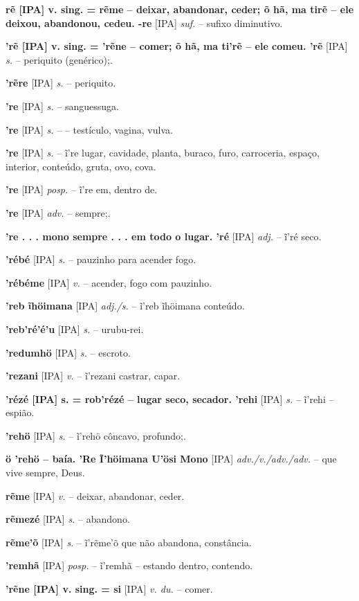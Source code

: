 \textbf{rẽ [IPA] v. sing. = rẽme -- deixar, abandonar, ceder; õ hã, ma tirẽ -- ele deixou, abandonou, cedeu. -re} [IPA] \textit{suf.} -- sufixo diminutivo.

\textbf{'rẽ [IPA] v. sing. = 'rẽne -- comer; õ hã, ma ti'rẽ -- ele comeu. 'rẽ} [IPA] \textit{s.} -- periquito (genérico);.

\textbf{'rẽre} [IPA] \textit{s.} -- periquito.

\textbf{'re} [IPA] \textit{s.} -- sanguessuga.

\textbf{'re} [IPA] \textit{s.} -- -- testículo, vagina, vulva.

\textbf{'re} [IPA] \textit{s.} -- ĩ're lugar, cavidade, planta, buraco, furo, carroceria, espaço, interior, conteúdo, gruta, ovo, cova.

\textbf{'re} [IPA] \textit{posp.} -- ĩ're em, dentro de.

\textbf{'re} [IPA] \textit{adv.} -- sempre;.

\textbf{'re . . . mono sempre . . . em todo o lugar. 'ré} [IPA] \textit{adj.} -- ĩ'ré seco.

\textbf{'rébé} [IPA] \textit{s.} -- pauzinho para acender fogo.

\textbf{'rébéme} [IPA] \textit{v.} -- acender, fogo com pauzinho.

\textbf{'reb ĩhöimana} [IPA] \textit{adj./s.} -- ĩ'reb ĩhöimana conteúdo.

\textbf{'reb'ré'é'u} [IPA] \textit{s.} -- urubu-rei.

\textbf{'redumhö} [IPA] \textit{s.} -- escroto.

\textbf{'rezani} [IPA] \textit{v.} -- ĩ'rezani castrar, capar.

\textbf{'rézé [IPA] s. = rob'rézé -- lugar seco, secador. 'rehi} [IPA] \textit{s.} -- ĩ'rehi -- espião.

\textbf{'rehö} [IPA] \textit{s.} -- ĩ'rehö côncavo, profundo;.

\textbf{ö 'rehö -- baía. 'Re Ĩ'höimana U'ösi Mono} [IPA] \textit{adv./v./adv./adv.} -- que vive sempre, Deus.

\textbf{rẽme} [IPA] \textit{v.} -- deixar, abandonar, ceder.

\textbf{rẽmezé} [IPA] \textit{s.} -- abandono.

\textbf{rẽme'õ} [IPA] \textit{s.} -- ĩ'rẽme'õ que não abandona, constância.

\textbf{'remhã} [IPA] \textit{posp.} -- ĩ'remhã -- estando dentro, contendo.

\textbf{'rẽne [IPA] v. sing. = si} [IPA] \textit{v. du.} -- comer.


